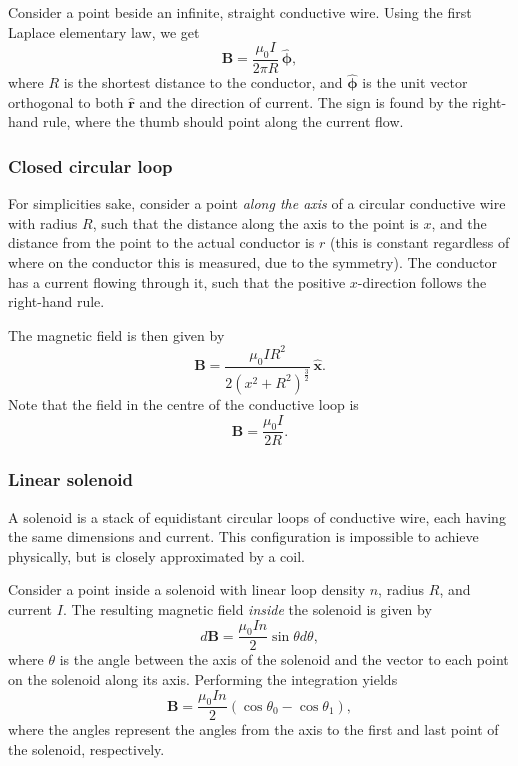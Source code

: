 \documentclass[a4paper, 12pt]{article}
\renewcommand{\vec}[1]{\mathbf{#1}}
\newcommand{\B}{\ensuremath{\vec{B}}}
\let\tmp\hat
\renewcommand{\hat}[1]{\vec{\tmp{#1}}}
\begin{document}
            Consider a point beside an infinite, straight conductive wire. Using the first Laplace elementary law, we get 
            \begin{equation}
                \B = \frac{\mu_0 I}{2\pi R}\,\hat{\phi},
            \end{equation}
            where $R$ is the shortest distance to the conductor, 
            and $\hat{\phi}$ is the  unit vector orthogonal to both $\hat{r}$ and the direction of current.
            The sign is found by the right-hand rule, where the thumb should point along the current flow.
            
        \subsubsection{Closed circular loop}
            For simplicities sake, consider a point \textit{along the axis} of a circular conductive wire with radius $R$, 
            such that the distance along the axis to the point is $x$, 
            and the distance from the point to the actual conductor is $r$ 
            (this is constant regardless of where on the conductor this is measured, due to the symmetry).
            The conductor has a current flowing through it, such that the positive $x$-direction follows the right-hand rule. 

            The magnetic field is then given by
            \begin{equation}
                \B = \frac{\mu_0 I R^2}{2 \left(x^2 + R^2\right)^\frac{3}{2}}\,\hat{x}.
            \end{equation}
            Note that the field in the centre of the conductive loop is
            \begin{equation}
                \B = \frac{\mu_0 I}{2R}.
            \end{equation}
        
        \subsubsection{Linear solenoid}
            A solenoid is a stack of equidistant circular loops of conductive wire, each having the same dimensions and current. 
            This configuration is impossible to achieve physically, but is closely approximated by a coil. 

            Consider a point inside a solenoid with linear loop density $n$, radius $R$, and current $I$. 
            The resulting magnetic field \textit{inside} the solenoid is given by
            \begin{equation}
                d\B = \frac{\mu_0 I n}{2}\sin\theta d\theta,
            \end{equation}
            where $\theta$ is the angle between the axis of the solenoid and the vector to each point on the solenoid along its axis.
            Performing the integration yields
            \begin{equation}
                \B = \frac{\mu_0 In}{2}\left(\cos\theta_0 - \cos\theta_1\right),
            \end{equation}
            where the angles represent the angles from the axis to the first and last point of the solenoid, respectively. 
\end{document}
